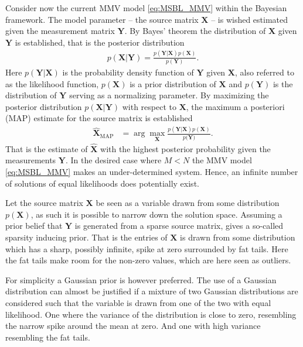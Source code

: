 Consider now the current MMV model \eqref{eq:MSBL_MMV} within the Bayesian framework. The model parameter -- the source matrix $\textbf{X}$ -- is wished estimated given the measurement matrix $\textbf{Y}$. 
By Bayes' theorem the distribution of $\textbf{X}$ given $\textbf{Y}$ is established, that is the posterior distribution 
\begin{align*}
p(\mathbf{X}|\mathbf{Y}) = \frac{p(\mathbf{Y}|\mathbf{X}) p(\mathbf{X})}{p(\mathbf{Y})}.
\end{align*} 
Here $p(\mathbf{Y}|\mathbf{X})$ is the probability density function of $\mathbf{Y}$ given $\mathbf{X}$, also referred to as the likelihood function, $p(\mathbf{X})$ is a prior distribution of $\mathbf{X}$ and $p(\mathbf{Y})$ is the distribution of $\mathbf{Y}$ serving as a normalizing parameter.
By maximizing the posterior distribution $p(\mathbf{X}|\mathbf{Y})$ with respect to $\mathbf{X}$, the maximum a posteriori (MAP) estimate for the source matrix is established
\begin{align*}
\hat{\mathbf{X}}_{\text{MAP}} &= \arg \max_{\mathbf{X}} \frac{p(\mathbf{Y} \vert \mathbf{X}) p(\mathbf{X})}{p(\mathbf{Y)}}.
\end{align*}
That is the estimate of $\hat{\mathbf{X}}$ with the highest posterior probability given the measurements $\mathbf{Y}$. 
In the desired case where $M < N$ the MMV model \eqref{eq:MSBL_MMV} makes an under-determined system. Hence, an infinite number of solutions of equal likelihoods does potentially exist.  

Let the source matrix $\mathbf{X}$ be seen as a variable drawn from some distribution $p(\mathbf{X})$, as such it is possible to narrow down the solution space. 
Assuming a prior belief that $\mathbf{Y}$ is generated from a sparse source matrix, gives a so-called sparsity inducing prior. 
That is the entries of $\mathbf{X}$ is drawn from some distribution which has a sharp, possibly infinite, spike at zero surrounded by fat tails. Here the fat tails make room for the non-zero values, which are here seen as outliers.

For simplicity a Gaussian prior is however preferred. 
The use of a Gaussian distribution can almost be justified if a mixture of two Gaussian distributions are considered such that the variable is drawn from one of the two with equal likelihood. 
One where the variance of the distribution is close to zero, resembling the narrow spike around the mean at zero. 
And one with high variance resembling the fat tails.       

